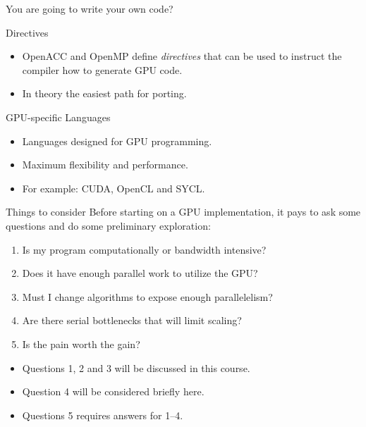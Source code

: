 \documentclass[aspectratio=43]{beamer}
\begin{document}
\begin{frame}[fragile]{You are going to write your own code?}

    \begin{info}{Directives}
        \begin{itemize}
            \item OpenACC and OpenMP define \emph{directives} that can be used to instruct the compiler how to generate GPU code.
            \item In theory the easiest path for porting.
        \end{itemize}
    \end{info}

    \begin{info}{GPU-specific Languages}
        \begin{itemize}
            \item Languages designed for GPU programming.
            \item Maximum flexibility and performance.
            \item For example: CUDA, OpenCL and SYCL.
        \end{itemize}
    \end{info}
\end{frame}

\begin{frame}[fragile]{Things to consider}
    Before starting on a GPU implementation, it pays to ask some questions and do some preliminary exploration:
    \begin{enumerate}
        \item Is my program computationally or bandwidth intensive?
        \item Does it have enough parallel work to utilize the GPU?
        \item Must I change algorithms to expose enough parallelelism?
        \item Are there serial bottlenecks that will limit scaling?
        \item Is the pain worth the gain?
    \end{enumerate}

    \begin{itemize}
        \item Questions 1, 2 and 3 will be discussed in this course.
        \item Question 4 will be considered briefly here.
        \item Questions 5 requires answers for 1--4.
    \end{itemize}
\end{frame}
\end{document}
